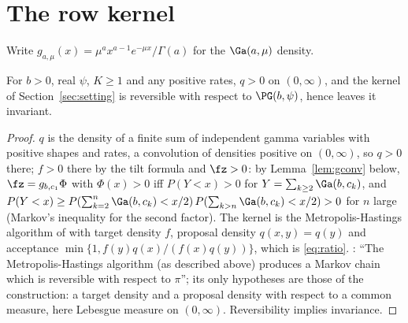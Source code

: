 \section{The row kernel}\label{sec:row}

Write $g_{a,\mu}(x)=\mu^ax^{a-1}e^{-\mu x}/\Gamma(a)$ for the $\Ga(a,\mu)$ density.

\begin{proposition}[Reversibility]\label{prop:rev}
For $b>0$, real $\psi$, $K\ge1$ and any positive rates, $q>0$ on $(0,\infty)$, and the kernel of
Section~\ref{sec:setting} is reversible with respect to $\PG(b,\psi)$, hence leaves it invariant.
\end{proposition}
\begin{proof}
$q$ is the density of a finite sum of independent gamma variables with positive shapes and rates, a convolution
of densities positive on $(0,\infty)$, so $q>0$ there; $f>0$ there by the tilt formula and $\fz>0$: by Lemma~\ref{lem:gconv} below,
$\fz=g_{b,c_1}\Phi$ with $\Phi(x)>0$ iff $P(Y<x)>0$ for $Y=\sum_{k\ge2}\Ga(b,c_k)$, and $P(Y<x)\ge P(\sum_{k=2}^n
\Ga(b,c_k)<x/2)\,P(\sum_{k>n}\Ga(b,c_k)<x/2)>0$ for $n$ large (Markov's inequality for the second factor). The kernel is the
Metropolis-Hastings algorithm of \cite[Sec.~2.1]{rr} with target density $f$, proposal density $q(x,y)=q(y)$
and acceptance $\min\{1,f(y)q(x)/(f(x)q(y))\}$, which is \eqref{eq:ratio}. \cite[Prop.~2]{rr}: ``The
Metropolis-Hastings algorithm (as described above) produces a Markov chain which is reversible with respect to
$\pi$''; its only hypotheses are those of the construction: a target density and a proposal density with respect
to a common measure, here Lebesgue measure on $(0,\infty)$. Reversibility implies invariance.
\end{proof}

